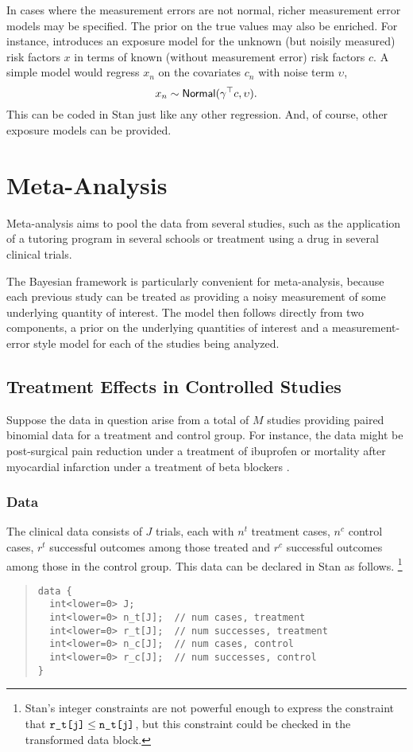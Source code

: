 In cases where the measurement errors are not normal, richer
measurement error models may be specified.  The prior on the true
values may also be enriched.  For instance, \citep{Clayton:1992}
introduces an exposure model for the unknown (but noisily measured)
risk factors $x$ in terms of known (without measurement error) risk
factors $c$.  A simple model would regress $x_n$ on the covariates
$c_n$ with noise term $\upsilon$,
\[
x_n \sim \mbox{\sf Normal}(\gamma^{\top}c, \upsilon).
\]
This can be coded in Stan just like any other regression.  And, of
course, other exposure models can be provided.


\section{Meta-Analysis}

Meta-analysis aims to pool the data from several studies, such as the
application of a tutoring program in several schools or treatment
using a drug in several clinical trials.  

The Bayesian framework is particularly convenient for meta-analysis,
because each previous study can be treated as providing a noisy
measurement of some underlying quantity of interest.  The model then
follows directly from two components, a prior on the underlying
quantities of interest and a measurement-error style model for each of
the studies being analyzed.

\subsection{Treatment Effects in Controlled Studies}

Suppose the data in question arise from a total of $M$ studies
providing paired binomial data for a treatment and control group.  For
instance, the data might be post-surgical pain reduction under a treatment
of ibuprofen \citep{WarnThompsonSpiegelhalter:2002} or mortality after
myocardial infarction under a treatment of beta blockers
\citep[Section~5.6]{GelmanEtAl:2013}.

\subsubsection{Data}

The clinical data consists of $J$ trials, each with $n^t$ treatment
cases, $n^c$ control cases, $r^t$ successful outcomes among those treated and
$r^c$ successful outcomes among those in the control group.  This data
can be declared in Stan as follows.%
%
\footnote{Stan's integer constraints are not powerful enough to express the
constraint that $\mbox{{\tt r\_t[j]}} \leq \mbox{{\tt n\_t[j]}}$,
but this constraint could be checked in the transformed data block.}
%
\begin{quote}
\begin{Verbatim}[fontsize=\small]
data {
  int<lower=0> J;
  int<lower=0> n_t[J];  // num cases, treatment
  int<lower=0> r_t[J];  // num successes, treatment
  int<lower=0> n_c[J];  // num cases, control
  int<lower=0> r_c[J];  // num successes, control
}
\end{Verbatim}
\end{quote}
%

